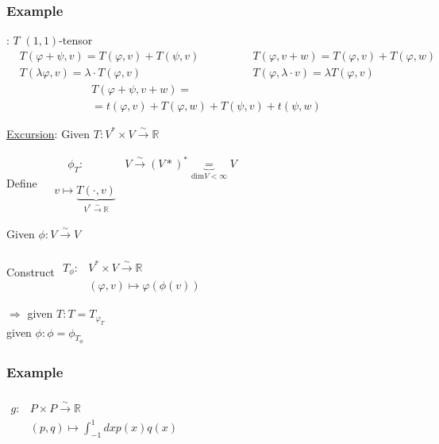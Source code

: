 \subsubsection{Example}: $T$ $(1,1)$-tensor
\[
\begin{aligned}
& T(\varphi + \psi, v) = T(\varphi,v) + T(\psi,v) \\ 
& T(\lambda \varphi , v) = \lambda \cdot T(\varphi,v)
\end{aligned} \qquad \qquad \begin{gathered}
T(\varphi,v+w) = T(\varphi,v) + T(\varphi,w) \\ 
T(\varphi, \lambda \cdot v) = \lambda T(\varphi, v) 
\end{gathered}
\]
\[
\begin{gathered}
T(\varphi + \psi , v+ w)  = \\
= t(\varphi,v) + T(\varphi,w) + T(\psi,v) + t(\psi,w)
\end{gathered}
\]

\underline{Excursion}:
Given $T:V^* \times V \xrightarrow{ \sim } \mathbb{R}$

Define $\begin{aligned} & \quad \ 
\phi_T: & V\xrightarrow{ \sim } (V*)^* \underbrace{=}_{\text{dim}V < \infty} V \\
& v\mapsto \underbrace{ T(\cdot , v)  }_{V^* \xrightarrow{ \sim } \mathbb{R}} \end{aligned}$

Given $\phi : V \xrightarrow{ \sim } V$

Construct $\begin{aligned} & \quad \\ 
T_{\phi} : & V^* \times V \xrightarrow{ \sim } \mathbb{R} \\
& (\varphi,v) \mapsto \varphi(\phi(v)) \end{aligned}$

$\Longrightarrow $ given $T: T = T_{\varphi_T}$ \\
\phantom{$\Longrightarrow$} given $\phi: \phi = \phi_{T_{\phi}}$

\subsubsection*{Example} $\begin{aligned} & \quad \\
g: & P \times P \xrightarrow{ \sim } \mathbb{R} \\
& (p,q) \mapsto \int_{-1}^1 dx p(x) q(x) \end{aligned}$

